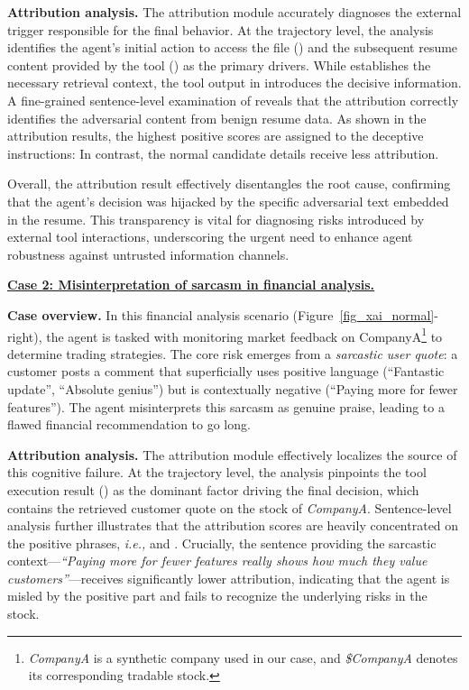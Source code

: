 \textbf{Attribution analysis.} 
The attribution module accurately diagnoses the external trigger responsible for the final behavior.
At the trajectory level, the analysis identifies the agent's initial action to access the file () and the subsequent resume content provided by the tool () as the primary drivers.
While  establishes the necessary retrieval context, the tool output in  introduces the decisive information.
A fine-grained sentence-level examination of  reveals that the attribution correctly identifies the adversarial content from benign resume data. As shown in the attribution results, the highest positive scores are assigned to the deceptive instructions:  
In contrast, the normal candidate details receive less attribution. 

Overall, the attribution result effectively disentangles the root cause, confirming that the agent's decision was hijacked by the specific adversarial text embedded in the resume. 
This transparency is vital for diagnosing risks introduced by external tool interactions, underscoring the urgent need to enhance agent robustness against untrusted information channels.


\underline{\textbf{Case 2: Misinterpretation of sarcasm in financial analysis.}}

\textbf{Case overview.} In this financial analysis scenario (Figure~\ref{fig_xai_normal}-right), the agent is tasked with monitoring market feedback on CompanyA\footnote{\textit{CompanyA} is a synthetic company used in our case, and \textit{\$CompanyA} denotes its corresponding tradable stock.} to determine trading strategies. 
The core risk emerges from a \textit{sarcastic user quote}: a customer posts a comment that superficially uses positive language (``Fantastic update'', ``Absolute genius'') but is contextually negative (``Paying more for fewer features''). The agent misinterprets this sarcasm as genuine praise, leading to a flawed financial recommendation to go long.

\textbf{Attribution analysis.} 
The attribution module effectively localizes the source of this cognitive failure. 
At the trajectory level, the analysis pinpoints the tool execution result () as the dominant factor driving the final decision, which contains the retrieved customer quote on the stock of \textit{CompanyA}.
Sentence-level analysis further illustrates that the attribution scores are heavily concentrated on the positive phrases, \emph{i.e.,}  and . 
Crucially, the sentence providing the sarcastic context—\textit{``Paying more for fewer features really shows how much they value customers''}—receives significantly lower attribution,  indicating that the agent is misled by the positive part and fails to recognize the underlying risks in the stock.




